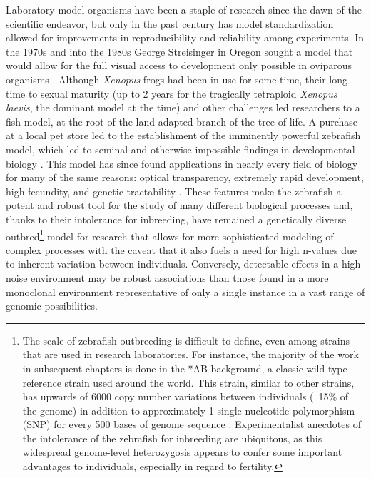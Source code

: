 Laboratory model organisms have been a staple of research since the dawn of the scientific endeavor, but only in the past century has model standardization allowed for improvements in reproducibility and reliability among experiments. In the 1970s and into the 1980s George Streisinger in Oregon sought a model that would allow for the full visual access to development only possible in oviparous organisms \citep{Streisinger1981}. Although \textit{Xenopus} frogs had been in use for some time, their long time to sexual maturity (up to 2 years for the tragically tetraploid \textit{Xenopus laevis}, the dominant model at the time) and other challenges led researchers to a fish model, at the root of the land-adapted branch of the tree of life. A purchase at a local pet store led to the establishment of the imminently powerful zebrafish model, which led to seminal and otherwise impossible findings in developmental biology \citep{ZFIN}. This model has since found applications in nearly every field of biology for many of the same reasons: optical transparency, extremely rapid development, high fecundity, and genetic tractability \citep{Grunwald2002, Eisen2020}. These features make the zebrafish a potent and robust tool for the study of many different biological processes and, thanks to their intolerance for inbreeding, have remained a genetically diverse outbred\footnote{The scale of zebrafish outbreeding is difficult to define, even among strains that are used in research laboratories. For instance, the majority of the work in subsequent chapters is done in the *AB background, a classic wild-type reference strain used around the world. This strain, similar to other strains, has upwards of 6000 copy number variations between individuals (~15\% of the genome) in addition to approximately 1 single nucleotide polymorphism (SNP) for every 500 bases of genome sequence \citep{Guryev2006, BalikMeisner2018, Brown2012}. Experimentalist anecdotes of the intolerance of the zebrafish for inbreeding are ubiquitous, as this widespread genome-level heterozygosis appears to confer some important advantages to individuals, especially in regard to fertility.} model for research that allows for more sophisticated modeling of complex processes with the caveat that it also fuels a need for high n-values due to inherent variation between individuals. Conversely, detectable effects in a high-noise environment may be robust associations than those found in a more monoclonal environment representative of only a single instance in a vast range of genomic possibilities.

